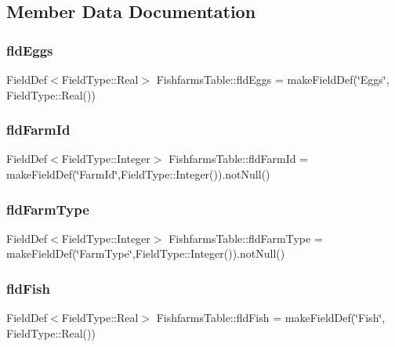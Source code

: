 \subsection{Member Data Documentation}
\mbox{\label{class_fishfarms_table_abb4170c921f4bcf9a734f33d00cdb019}} 
\subsubsection{\texorpdfstring{fldEggs}{fldEggs}}
{\footnotesize\ttfamily Field\+Def$<$Field\+Type\+::\+Real$>$ Fishfarms\+Table\+::fld\+Eggs = make\+Field\+Def(\char`\"{}Eggs\char`\"{}, Field\+Type\+::\+Real())}

\mbox{\label{class_fishfarms_table_a4a8043cc9d52002aeb28c04841080e82}} 
\subsubsection{\texorpdfstring{fldFarmId}{fldFarmId}}
{\footnotesize\ttfamily Field\+Def$<$Field\+Type\+::\+Integer$>$ Fishfarms\+Table\+::fld\+Farm\+Id = make\+Field\+Def(\char`\"{}Farm\+Id\char`\"{},Field\+Type\+::\+Integer()).not\+Null()}

\mbox{\label{class_fishfarms_table_ac79c9ee3fb7bbe92ff4a2e327bec3010}} 
\subsubsection{\texorpdfstring{fldFarmType}{fldFarmType}}
{\footnotesize\ttfamily Field\+Def$<$Field\+Type\+::\+Integer$>$ Fishfarms\+Table\+::fld\+Farm\+Type = make\+Field\+Def(\char`\"{}Farm\+Type\char`\"{},Field\+Type\+::\+Integer()).not\+Null()}

\mbox{\label{class_fishfarms_table_aa614995248d0c6adf89ff17bc717c107}} 
\subsubsection{\texorpdfstring{fldFish}{fldFish}}
{\footnotesize\ttfamily Field\+Def$<$Field\+Type\+::\+Real$>$ Fishfarms\+Table\+::fld\+Fish = make\+Field\+Def(\char`\"{}Fish\char`\"{}, Field\+Type\+::\+Real())}

